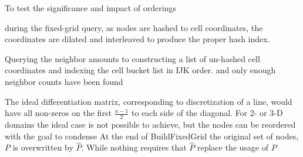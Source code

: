 \documentclass{report}
\begin{document}
%




To test the significance and impact of orderings

during the fixed-grid query, as nodes are hashed to cell coordinates, the coordinates are dilated and interleaved to produce the proper hash index. 

Querying the neighbor amounts to constructing a list of un-hashed cell coordinates and indexing the cell bucket list in IJK order.  and only enough neighbor counts have been found

The ideal differentiation matrix, corresponding to discretization of a line, would have all non-zeros on the first $\frac{n-1}{2}$ to each side of the diagonal. For 2- or 3-D domains the ideal case is not possible to achieve, but the nodes can be reordered with the goal to condense
At the end of BuildFixedGrid the original set of nodes, $P$ is overwritten by $\hat{P}$. While nothing requires that $\hat{P}$ replace the usage of $P$ 
\end{document}
